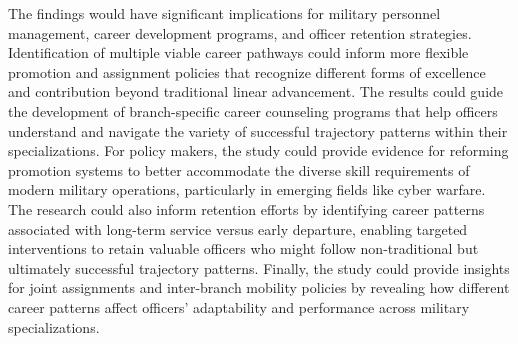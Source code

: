 \documentclass[../main.tex]{subfiles}
\begin{document}
The findings would have significant implications for military personnel management, career development programs, and officer retention strategies. Identification of multiple viable career pathways could inform more flexible promotion and assignment policies that recognize different forms of excellence and contribution beyond traditional linear advancement. The results could guide the development of branch-specific career counseling programs that help officers understand and navigate the variety of successful trajectory patterns within their specializations. For policy makers, the study could provide evidence for reforming promotion systems to better accommodate the diverse skill requirements of modern military operations, particularly in emerging fields like cyber warfare. The research could also inform retention efforts by identifying career patterns associated with long-term service versus early departure, enabling targeted interventions to retain valuable officers who might follow non-traditional but ultimately successful trajectory patterns. Finally, the study could provide insights for joint assignments and inter-branch mobility policies by revealing how different career patterns affect officers' adaptability and performance across military specializations.
\end{document}
